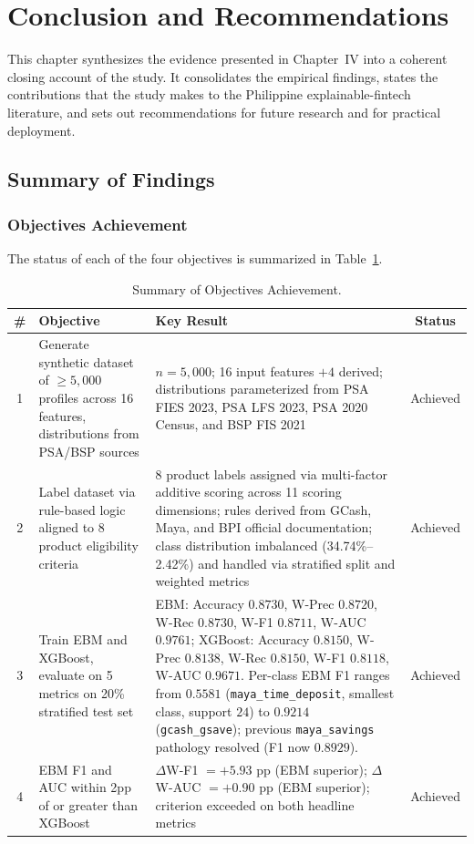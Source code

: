 \documentclass[journal]{./IEEE/IEEEtran}
\begin{document}
\section{Conclusion and Recommendations}

This chapter synthesizes the evidence presented in Chapter~IV into a coherent closing account of the study. It consolidates the empirical findings, states the contributions that the study makes to the Philippine explainable-fintech literature, and sets out recommendations for future research and for practical deployment.

\subsection{Summary of Findings}

\subsubsection{Objectives Achievement}

The status of each of the four objectives is summarized in Table~\ref{tab:obj}.

\begin{table}[h]
    \centering
    \caption{Summary of Objectives Achievement.}
    \label{tab:obj}
    \footnotesize
    \begin{tabular}{|c|p{5.5cm}|p{7.0cm}|c|}
        \hline
        \textbf{\#} & \textbf{Objective} & \textbf{Key Result} & \textbf{Status} \\
        \hline
        1 & Generate synthetic dataset of $\geq 5{,}000$ profiles across 16 features, distributions from PSA/BSP sources & $n = 5{,}000$; 16 input features $+ 4$ derived; distributions parameterized from PSA FIES 2023, PSA LFS 2023, PSA 2020 Census, and BSP FIS 2021 & Achieved \\
        \hline
        2 & Label dataset via rule-based logic aligned to 8 product eligibility criteria & 8 product labels assigned via multi-factor additive scoring across 11 scoring dimensions; rules derived from GCash, Maya, and BPI official documentation; class distribution imbalanced (34.74\%--2.42\%) and handled via stratified split and weighted metrics & Achieved \\
        \hline
        3 & Train EBM and XGBoost, evaluate on 5 metrics on 20\% stratified test set & EBM: Accuracy $0.8730$, W-Prec $0.8720$, W-Rec $0.8730$, W-F1 $0.8711$, W-AUC $0.9761$; XGBoost: Accuracy $0.8150$, W-Prec $0.8138$, W-Rec $0.8150$, W-F1 $0.8118$, W-AUC $0.9671$. Per-class EBM F1 ranges from $0.5581$ (\texttt{maya\_time\_deposit}, smallest class, support $24$) to $0.9214$ (\texttt{gcash\_gsave}); previous \texttt{maya\_savings} pathology resolved (F1 now $0.8929$). & Achieved \\
        \hline
        4 & EBM F1 and AUC within 2pp of or greater than XGBoost & $\Delta$W-F1 $= +5.93$ pp (EBM superior); $\Delta$W-AUC $= +0.90$ pp (EBM superior); criterion exceeded on both headline metrics & Achieved \\
        \hline
    \end{tabular}
\end{table}
\end{document}
